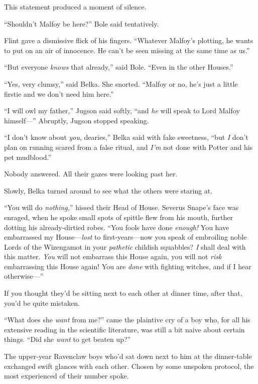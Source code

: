 This statement produced a moment of silence.

“Shouldn’t Malfoy be here?” Bole said tentatively.

Flint gave a dismissive flick of his fingers. “Whatever Malfoy’s plotting, he wants to put on an air of innocence. He can’t be seen missing at the same time as us.”

“But everyone \emph{knows} that already,” said Bole. “Even in the other Houses.”

“Yes, very clumsy,” said Belka. She snorted. “Malfoy or no, he’s just a little firstie and we don’t need him here.”

“I will owl my father,” Jugson said softly, “and \emph{he} will speak to Lord Malfoy himself—” Abruptly, Jugson stopped speaking.

“I don’t know about \emph{you}, dearies,” Belka said with fake sweetness, “but \emph{I} don’t plan on running scared from a false ritual, and \emph{I’m} not done with Potter and his pet mudblood.”

Nobody answered. All their gazes were looking past her.

Slowly, Belka turned around to see what the others were staring at.

“You will do \emph{nothing,}” hissed their Head of House. Severus Snape’s face was enraged, when he spoke small spots of spittle flew from his mouth, further dotting his already-dirtied robes. “You fools have done \emph{enough!} You have embarrassed my House—\emph{lost} to first-years—now you speak of embroiling noble Lords of the Wizengamot in your \emph{pathetic} childish squabbles? \emph{I} shall deal with this matter. \emph{You} will not embarrass this House again, you will not \emph{risk} embarrassing this House again! You are \emph{done} with fighting witches, and if I hear otherwise—”

\later

If you thought they’d be sitting next to each other at dinner time, after that, you’d be quite mistaken.

“What does she \emph{want} from me?” came the plaintive cry of a boy who, for all his extensive reading in the scientific literature, was still a bit naive about certain things. “Did she \emph{want} to get beaten up?”

The upper-year Ravenclaw boys who’d sat down next to him at the dinner-table exchanged swift glances with each other. Chosen by some unspoken protocol, the most experienced of their number spoke.

